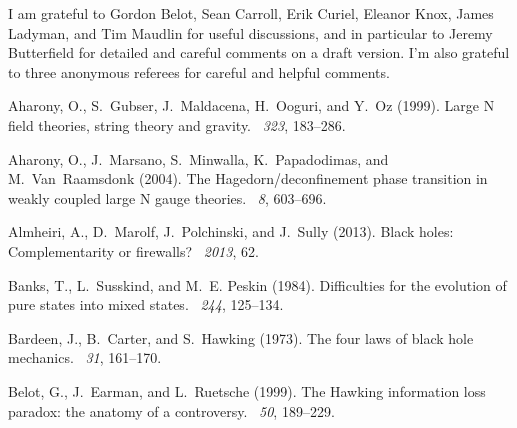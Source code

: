 \documentclass[12pt]{article}
\begin{document}
I am grateful to Gordon Belot, Sean Carroll, Erik Curiel, Eleanor Knox, James Ladyman, and Tim Maudlin for useful discussions, and in particular to Jeremy Butterfield for detailed and careful comments on a draft version. I'm also grateful to three anonymous referees for careful and helpful comments.


%
%

\begin{thebibliography}{}

\raggedright

Aharony, O., S.~Gubser, J.~Maldacena, H.~Ooguri, and Y.~Oz (1999).
\newblock Large {N} field theories, string theory and gravity.
~{\em 323}, 183--286.

Aharony, O., J.~Marsano, S.~Minwalla, K.~Papadodimas, and M.~Van~Raamsdonk
  (2004).
\newblock The {H}agedorn/deconfinement phase transition in weakly coupled large
  {N} gauge theories.
~{\em 8},
  603--696.

Almheiri, A., D.~Marolf, J.~Polchinski, and J.~Sully (2013).
\newblock Black holes: Complementarity or firewalls?
~{\em 2013}, 62.

Banks, T., L.~Susskind, and M.~E. Peskin (1984).
\newblock Difficulties for the evolution of pure states into mixed states.
~{\em 244}, 125--134.

Bardeen, J., B.~Carter, and S.~Hawking (1973).
\newblock The four laws of black hole mechanics.
~{\em 31}, 161--170.

Belot, G., J.~Earman, and L.~Ruetsche (1999).
\newblock The {H}awking information loss paradox: the anatomy of a controversy.
~{\em 50},
  189--229.


\end{thebibliography}
\end{document}
